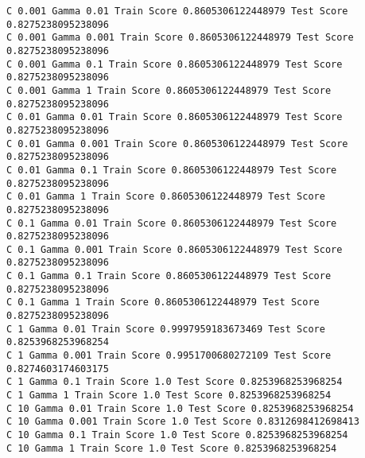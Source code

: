 \documentclass[11pt]{article}
\begin{document}
    \begin{Verbatim}[commandchars=\\\{\}]
C 0.001 Gamma 0.01 Train Score 0.8605306122448979 Test Score 0.8275238095238096
C 0.001 Gamma 0.001 Train Score 0.8605306122448979 Test Score 0.8275238095238096
C 0.001 Gamma 0.1 Train Score 0.8605306122448979 Test Score 0.8275238095238096
C 0.001 Gamma 1 Train Score 0.8605306122448979 Test Score 0.8275238095238096
C 0.01 Gamma 0.01 Train Score 0.8605306122448979 Test Score 0.8275238095238096
C 0.01 Gamma 0.001 Train Score 0.8605306122448979 Test Score 0.8275238095238096
C 0.01 Gamma 0.1 Train Score 0.8605306122448979 Test Score 0.8275238095238096
C 0.01 Gamma 1 Train Score 0.8605306122448979 Test Score 0.8275238095238096
C 0.1 Gamma 0.01 Train Score 0.8605306122448979 Test Score 0.8275238095238096
C 0.1 Gamma 0.001 Train Score 0.8605306122448979 Test Score 0.8275238095238096
C 0.1 Gamma 0.1 Train Score 0.8605306122448979 Test Score 0.8275238095238096
C 0.1 Gamma 1 Train Score 0.8605306122448979 Test Score 0.8275238095238096
C 1 Gamma 0.01 Train Score 0.9997959183673469 Test Score 0.8253968253968254
C 1 Gamma 0.001 Train Score 0.9951700680272109 Test Score 0.8274603174603175
C 1 Gamma 0.1 Train Score 1.0 Test Score 0.8253968253968254
C 1 Gamma 1 Train Score 1.0 Test Score 0.8253968253968254
C 10 Gamma 0.01 Train Score 1.0 Test Score 0.8253968253968254
C 10 Gamma 0.001 Train Score 1.0 Test Score 0.8312698412698413
C 10 Gamma 0.1 Train Score 1.0 Test Score 0.8253968253968254
C 10 Gamma 1 Train Score 1.0 Test Score 0.8253968253968254

    \end{Verbatim}
\end{document}
